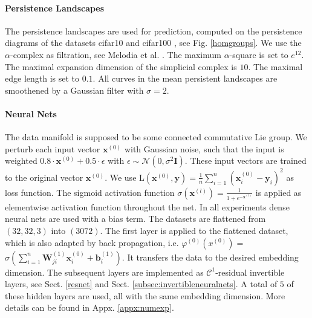 \documentclass[envcountsect,runningheads]{llncs}
\begin{document}
\paragraph{Persistence Landscapes} The persistence landscapes are used for prediction, computed on the persistence diagrams of the datasets cifar10 and cifar100 , see Fig. \ref{homgroups}. We use the $\alpha$-complex as filtration, see Melodia et al. . The maximum $\alpha$-square is set to $e^{12}$. The maximal expansion dimension of the simplicial complex is $10$. The maximal edge length is set to $0.1$. All curves in the mean persistent landscapes are smoothened by a Gaussian filter with $\sigma = 2$.


\paragraph{Neural Nets} The data manifold is supposed to be some connected commutative Lie group. We perturb each input vector $\textbf{x}^{(0)}$ with Gaussian noise, such that the input is weighted $0.8 \cdot \textbf{x}^{(0)} + 0.5 \cdot \epsilon$ with $\epsilon \sim \mathcal{N}(0,\sigma^2 \mathbf{I})$. These input vectors are trained to the original vector $\textbf{x}^{(0)}$. We use $\text{L}(\textbf{x}^{(0)}, \textbf{y}) = \frac{1}{n} \sum_{i=1}^{n} \left(\textbf{x}^{(0)}_i-\textbf{y}_i\right)^2$ as loss function. The sigmoid activation function $\sigma(\mathbf{x}^{(l)}) = \frac{1}{1 + e^{-\mathbf{x}^{(l)}}}$ is applied as elementwise activation function throughout the net. In all experiments dense neural nets are used with a bias term. The datasets are flattened from $(32,32,3)$ into $(3072)$. The first layer is applied to the flattened dataset, which is also adapted by back propagation, i.e. $\varphi^{(0)}\left(x^{(0)} \right) =$ $\sigma\left( \sum_{i=1}^{n} \textbf{W}_{ji}^{(1)} \textbf{x}_{i}^{(0)} + \textbf{b}_{i}^{(1)} \right)$. It transfers the data to the desired embedding dimension. The subsequent layers are implemented as $\mathcal{C}^1$-residual invertible layers, see Sect. \ref{resnet} and Sect. \ref{subsec:invertibleneuralnets}. A total of $5$ of these hidden layers are used, all with the same embedding dimension. More details can be found in Appx. \ref{appx:numexp}.
\end{document}
